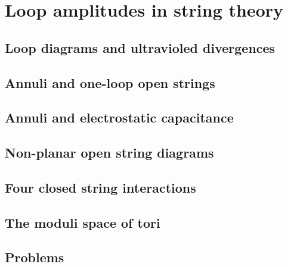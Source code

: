 \documentclass[12pt]{report}
\begin{document}
\chapter{Loop amplitudes in string theory}
\newpage
\section{Loop diagrams and ultravioled divergences}
\section{Annuli and one-loop open strings}
\section{Annuli and electrostatic capacitance}
\section{Non-planar open string diagrams}
\section{Four closed string interactions}
\section{The moduli space of tori}
\section{Problems}
\end{document}
